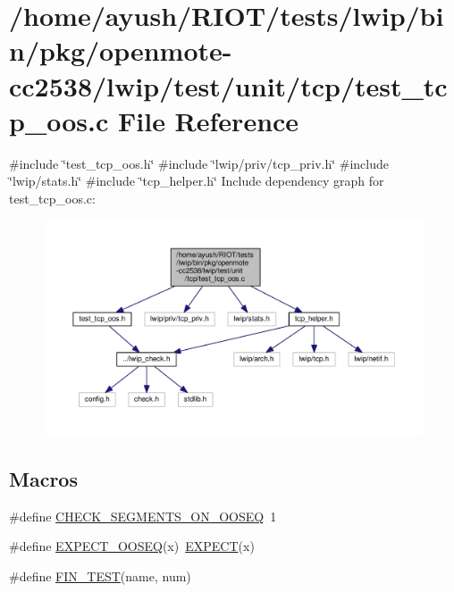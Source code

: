 \hypertarget{openmote-cc2538_2lwip_2test_2unit_2tcp_2test__tcp__oos_8c}{}\section{/home/ayush/\+R\+I\+O\+T/tests/lwip/bin/pkg/openmote-\/cc2538/lwip/test/unit/tcp/test\+\_\+tcp\+\_\+oos.c File Reference}
\label{openmote-cc2538_2lwip_2test_2unit_2tcp_2test__tcp__oos_8c}
{\ttfamily \#include \char`\"{}test\+\_\+tcp\+\_\+oos.\+h\char`\"{}}\newline
{\ttfamily \#include \char`\"{}lwip/priv/tcp\+\_\+priv.\+h\char`\"{}}\newline
{\ttfamily \#include \char`\"{}lwip/stats.\+h\char`\"{}}\newline
{\ttfamily \#include \char`\"{}tcp\+\_\+helper.\+h\char`\"{}}\newline
Include dependency graph for test\+\_\+tcp\+\_\+oos.\+c\+:
\nopagebreak
\begin{figure}[H]
\begin{center}
\leavevmode
\includegraphics[width=350pt]{openmote-cc2538_2lwip_2test_2unit_2tcp_2test__tcp__oos_8c__incl}
\end{center}
\end{figure}
\subsection*{Macros}
\begin{DoxyCompactItemize}
\item 
\#define \hyperlink{openmote-cc2538_2lwip_2test_2unit_2tcp_2test__tcp__oos_8c_a1b222cdb2028d5a8d00999755f5a67f0}{C\+H\+E\+C\+K\+\_\+\+S\+E\+G\+M\+E\+N\+T\+S\+\_\+\+O\+N\+\_\+\+O\+O\+S\+EQ}~1
\item 
\#define \hyperlink{openmote-cc2538_2lwip_2test_2unit_2tcp_2test__tcp__oos_8c_a9dd8bcd26408850f5df0fde4d89d8252}{E\+X\+P\+E\+C\+T\+\_\+\+O\+O\+S\+EQ}(x)~\hyperlink{openmote-cc2538_2lwip_2test_2unit_2lwip__check_8h_a8939fc832773dcf2c81b93d8bbf88603}{E\+X\+P\+E\+CT}(x)
\item 
\#define \hyperlink{openmote-cc2538_2lwip_2test_2unit_2tcp_2test__tcp__oos_8c_a332a376454291a861d5e423e3dd1284a}{F\+I\+N\+\_\+\+T\+E\+ST}(name,  num)
\end{DoxyCompactItemize}
